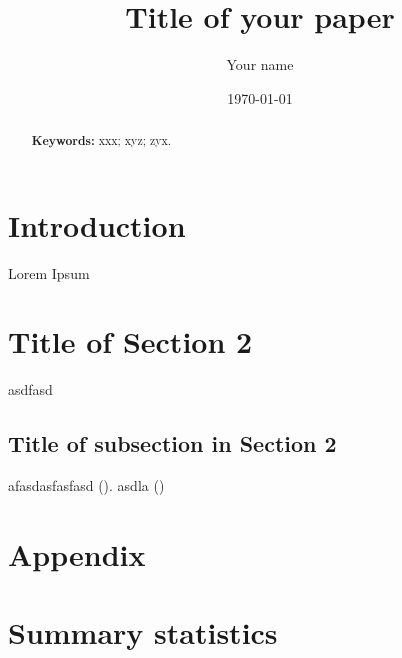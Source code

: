 \documentclass[11pt]{article}
\title{Title of your paper}
\author{Your name}
\date{\today}
\begin{document}
\maketitle


\begin{abstract}
	\singlespacing
	\noindent 
	
	\noindent \textbf{Keywords:} xxx; xyz; zyx. 
\end{abstract}


\section{Introduction}
Lorem Ipsum
\section{Title of Section 2}
asdfasd
\subsection{Title of subsection in Section 2}
afasdasfasfasd (\cite{Landrigan.2017}). asdla (\cite{Test.01012022})





\newpage

\begin{subappendices}
\appendix

\section*{Appendix}\label{Appendix}
\singlespacing
\section{Summary statistics}\label{ASec:xxxxx}
	
\end{subappendices}	



\newpage
{\footnotesize 
	
	\singlespacing
	
}


\end{document}
